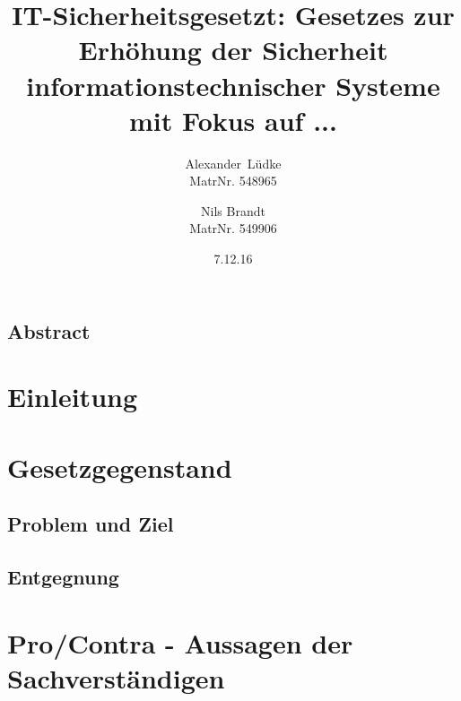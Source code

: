 \documentclass[letterpaper,twocolumn,10pt]{article}
\begin{document}
\date{7.12.16}

\title{\Large \bf IT-Sicherheitsgesetzt: Gesetzes zur Erhöhung der Sicherheit  
informationstechnischer Systeme\\ mit Fokus auf ...}

\author{
{\rm Alexander\ Lüdke}\\
MatrNr. 548965
\and
{\rm Nils Brandt}\\
MatrNr. 549906
}

\maketitle

\thispagestyle{empty}


\subsection*{Abstract}

\section{Einleitung}

\section{Gesetzgegenstand}
	\subsection{Problem und Ziel}
	\subsection{Entgegnung}

\section{Pro/Contra - Aussagen der Sachverständigen}


{\footnotesize }

\theendnotes %
\end{document}
